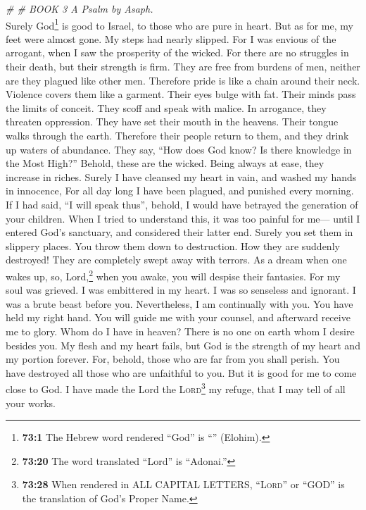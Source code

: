 \emph{\# \# BOOK 3 A Psalm by Asaph.}\\
 Surely God\footnote{\textbf{73:1} The Hebrew word
  rendered ``God'' is ``'' (Elohim).} is good to Israel,
to those who are pure in heart.  But as for me, my feet
were almost gone. My steps had nearly slipped.  For I was
envious of the arrogant, when I saw the prosperity of the wicked.
 For there are no struggles in their death, but their
strength is firm.  They are free from burdens of men,
neither are they plagued like other men.  Therefore pride
is like a chain around their neck. Violence covers them like a garment.
 Their eyes bulge with fat. Their minds pass the limits of
conceit.  They scoff and speak with malice. In arrogance,
they threaten oppression.  They have set their mouth in
the heavens. Their tongue walks through the earth. 
Therefore their people return to them, and they drink up waters of
abundance.  They say, ``How does God know? Is there
knowledge in the Most High?''  Behold, these are the
wicked. Being always at ease, they increase in riches. 
Surely I have cleansed my heart in vain, and washed my hands in
innocence,  For all day long I have been plagued, and
punished every morning.  If I had said, ``I will speak
thus'', behold, I would have betrayed the generation of your children.
 When I tried to understand this, it was too painful for
me---  until I entered God's sanctuary, and considered
their latter end.  Surely you set them in slippery
places. You throw them down to destruction.  How they are
suddenly destroyed! They are completely swept away with terrors.
 As a dream when one wakes up, so, Lord,\footnote{\textbf{73:20}
  The word translated ``Lord'' is ``Adonai.''} when you awake, you will
despise their fantasies.  For my soul was grieved. I was
embittered in my heart.  I was so senseless and ignorant.
I was a brute beast before you.  Nevertheless, I am
continually with you. You have held my right hand.  You
will guide me with your counsel, and afterward receive me to glory.
 Whom do I have in heaven? There is no one on earth whom
I desire besides you.  My flesh and my heart fails, but
God is the strength of my heart and my portion forever. 
For, behold, those who are far from you shall perish. You have destroyed
all those who are unfaithful to you.  But it is good for
me to come close to God. I have made the Lord the
\textsc{Lord}\footnote{\textbf{73:28} When rendered in ALL CAPITAL
  LETTERS, ``\textsc{Lord}'' or ``GOD'' is the translation of God's
  Proper Name.} my refuge, that I may tell of all your works.

